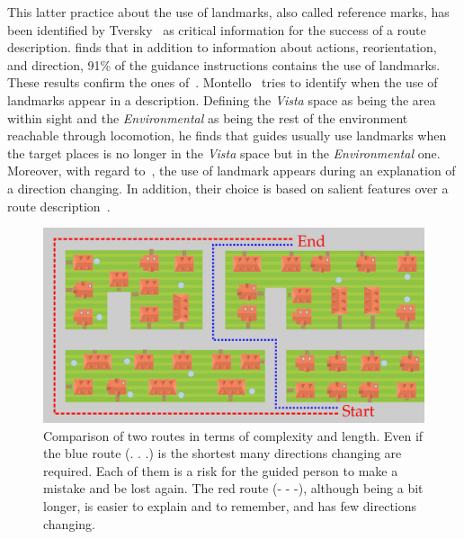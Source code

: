 This latter practice about the use of landmarks, also called reference marks, has been identified by Tversky~\cite{tversky_1999_pictorial} as critical information for the success of a route description. \cite{tversky_1998_space} finds that in addition to information about actions, reorientation, and direction, 91\% of the guidance instructions contains the use of landmarks. These results confirm the ones of~\cite{denis_1997_description}. Montello~\cite{montello_1993_scale} tries to identify when the use of landmarks appear in a description. Defining the \textit{Vista} space as being the area within sight and the \textit{Environmental} as being the rest of the environment reachable through locomotion, he finds that guides usually use landmarks when the target places is no longer in the \textit{Vista} space but in the \textit{Environmental} one. Moreover, with regard to~\cite{tversky_1999_pictorial}, the use of landmark appears during an explanation of a direction changing. In addition, their choice is based on salient features over a route description~\cite{nothegger_2004_selection}.

\begin{figure}[ht!]
\centering
\includegraphics[scale=0.22]{figures/chapter3/landscape/landscape.png}
\caption{\label{fig:chap3_shortest} Comparison of two routes in terms of complexity and length. Even if the blue route (. . .) is the shortest many directions changing are required. Each of them is a risk for the guided person to make a mistake and be lost again. The red route (- - -), although being a bit longer, is easier to explain and to remember, and has few directions changing.}
\end{figure}

